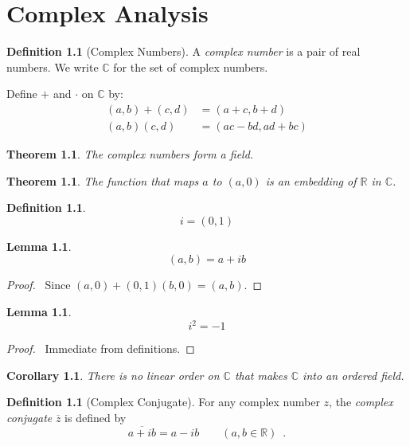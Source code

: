 \documentclass{book}
\let\qed\relax
\newtheorem{cor}{Corollary}[prop]
\newtheorem{thm}[prop]{Theorem}
\newtheorem{lm}[prop]{Lemma}
\theoremstyle{definition}
\newtheorem{df}[prop]{Definition}
\begin{document}
\chapter{Complex Analysis}

\renewcommand{\Re}{\ensuremath{\operatorname{Re}}}
\renewcommand{\Im}{\ensuremath{\operatorname{Im}}}

\begin{df}[Complex Numbers]
A \emph{complex number} is a pair of real numbers. We write $\mathbb{C}$ for the set of complex numbers.

Define $+$ and $\cdot$ on $\mathbb{C}$ by:
\begin{align*}
(a,b) + (c,d) & = (a+c,b+d) \\
(a,b)(c,d) & = (ac-bd,ad+bc)
\end{align*}
\end{df}

\begin{thm}
The complex numbers form a field.
\end{thm}


\begin{thm}
The function that maps $a$ to $(a,0)$ is an embedding of $\mathbb{R}$ in $\mathbb{C}$.
\end{thm}


\begin{df}
\[ i = (0,1) \]
\end{df}

\begin{lm}
\[ (a,b) = a + ib \]
\end{lm}

\begin{proof}
\pf\ Since $(a,0) + (0,1)(b,0) = (a,b)$. \qed
\end{proof}

\begin{lm}
\[ i^2 = -1 \]
\end{lm}

\begin{proof}
\pf\ Immediate from definitions. \qed
\end{proof}

\begin{cor}
There is no linear order on $\mathbb{C}$ that makes $\mathbb{C}$ into an ordered field.
\end{cor}

\begin{df}[Complex Conjugate]
For any complex number $z$, the \emph{complex conjugate} $\overline{z}$ is defined by
\[ \overline{a + ib} = a - ib \qquad (a,b \in \mathbb{R}) \enspace . \]
\end{df}
\end{document}
